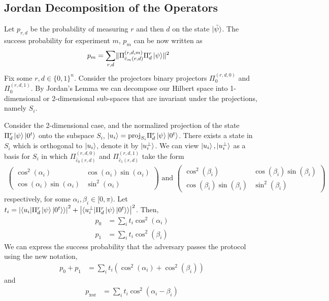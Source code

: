 \documentclass{article}
\begin{document}
\subsection{Jordan Decomposition of the Operators} 
Let $p_{r,d}$ be the probability of measuring $r$ and then $d$ on the state $\ket{\tilde{\psi}}$. The success probability for experiment $m$, $p_{m}$ can be now written as \begin{align}
    p_{m} &= \sum_{r,d}\lVert \Pi_{\hat{c}_{m}(r,d)}^{(r,d,m)}\Pi_{d}^{r}\ket{\psi}\rVert^{2}
\end{align} Fix some $r,d\in \{0,1\}^{n}$. Consider the projectors binary projectors $\Pi_{0}^{(r,d,0)}$ and $\Pi_{0}^{(r,d,1)}$. By Jordan's Lemma we can decompose our Hilbert space into 1-dimensional or 2-dimensional sub-spaces that are invariant under the projections, namely $S_{i}$. 

Consider the 2-dimensional case, and the normalized projection of the state $\Pi_{d}^{r}\ket{\psi}\ket{0^{t}}$ onto the subspace $S_{i}$, $\ket{u_{i}}=\mathrm{proj}_{S_{i}}\Pi_{d}^{r}\ket{\psi}\ket{0^{t}}$. There exists a state in $S_{i}$ which is orthogonal to $\ket{u_{i}}$, denote it by $\ket{u^{\perp}_{i}}$. We can view $\ket{u_{i}},\ket{u^{\perp}_{i}}$ as a basis for $S_{i}$ in which $\Pi_{\hat{c}_{0}(r,d)}^{(r,d,0)}$ and $\Pi_{\hat{c}_{1}(r,d)}^{(r,d,1)}$ take the form \begin{align}\begin{pmatrix}
\cos^{2}(\alpha_{i}) & \cos(\alpha_{i})\sin(\alpha_{i})\\
\cos(\alpha_{i})\sin(\alpha_{i}) & \sin^{2}(\alpha_{i})
\end{pmatrix}\text{ and }\begin{pmatrix}
\cos^{2}(\beta_{i}) & \cos(\beta_{i})\sin(\beta_{i})\\
\cos(\beta_{i})\sin(\beta_{i}) & \sin^{2}(\beta_{i})
\end{pmatrix}\end{align} respectively, for some $\alpha_{i},\beta_{i}\in [0,\pi)$. 
Let $t_{i}=\left|\braket{u_{i}|\Pi_{d}^{r}\ket{\psi}\ket{0^{t}}}\right|^{2}+\left|\braket{u^{\perp}_{i}|\Pi_{d}^{r}\ket{\psi}\ket{0^{t}}}\right|^{2}$. Then, \begin{align}
    p_{0} &= \sum_{i}t_{i}\cos^{2}(\alpha_{i})\\
    p_{1} &=\sum_{i}t_{i}\cos^{2}(\beta_{i})
\end{align}
We can express the success probability that the adversary passes the protocol using the new notation, \begin{align}p_{0}+p_{1}&=\sum_{i}t_{i}(\cos^{2}(\alpha_{i})+\cos^{2}(\beta_{i}))\end{align} and \begin{align}p_{\mathrm{xor}}&=\sum_{i}t_{i}\cos^{2}(\alpha_{i}-\beta_{i})\end{align}
\end{document}
